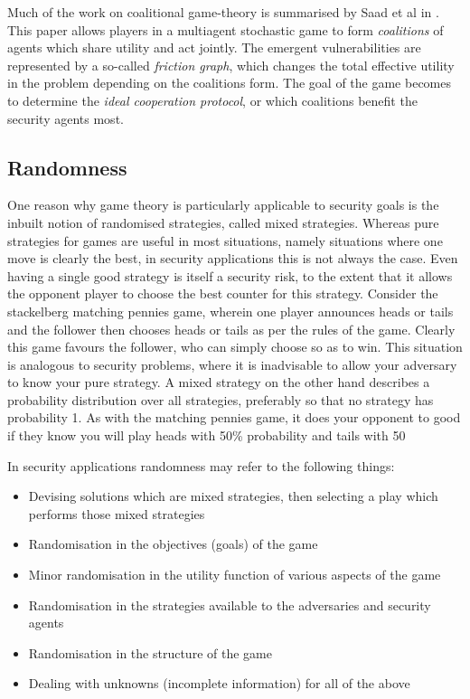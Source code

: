 \documentclass{article}
\begin{document}
Much of the work on coalitional game-theory is summarised by Saad et al in \cite{coalition}.
This paper allows players in a multiagent stochastic game to form {\em coalitions} of agents which share utility and act jointly.
The emergent vulnerabilities are represented by a so-called {\em friction graph}, which changes the total effective utility in the problem depending on the coalitions form.
The goal of the game becomes to determine the {\em ideal cooperation protocol}, or which coalitions benefit the security agents most.

\subsection{Randomness}
\label{secRandom}

One reason why game theory is particularly applicable to security goals is the inbuilt notion of randomised strategies, called mixed strategies.
Whereas pure strategies for games are useful in most situations, namely situations where one move is clearly the best, in security applications this is not always the case.
Even having a single good strategy is itself a security risk, to the extent that it allows the opponent player to choose the best counter for this strategy.
Consider the stackelberg matching pennies game, wherein one player announces heads or tails and the follower then chooses heads or tails as per the rules of the game.
Clearly this game favours the follower, who can simply choose so as to win.
This situation is analogous to security problems, where it is inadvisable to allow your adversary to know your pure strategy.
A mixed strategy on the other hand describes a probability distribution over all strategies, preferably so that no strategy has probability 1.
As with the matching pennies game, it does your opponent to good if they know you will play heads with 50\% probability and tails with 50%

In security applications randomness may refer to the following things:
\begin{itemize}
	\item Devising solutions which are mixed strategies, then selecting a play which performs those mixed strategies
	\item Randomisation in the objectives (goals) of the game
	\item Minor randomisation in the utility function of various aspects of the game
	\item Randomisation in the strategies available to the adversaries and security agents
	\item Randomisation in the structure of the game
	\item Dealing with unknowns (incomplete information) for all of the above
\end{itemize}
\end{document}
